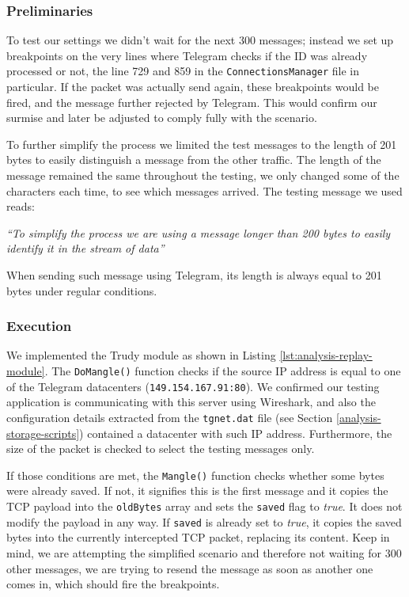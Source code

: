 \documentclass[thesis=M,english]{FITthesis}[2012/10/20]
\begin{document}
\subsubsection{Preliminaries}

To test our settings we didn't wait for the next 300 messages; instead we set up breakpoints on the very lines where Telegram checks if the ID was already processed or not, the line 729 and 859 in the \texttt{ConnectionsManager} file in particular. If the packet was actually send again, these breakpoints would be fired, and the message further rejected by Telegram. This would confirm our surmise and later be adjusted to comply fully with the scenario.

To further simplify the process we limited the test messages to the length of 201 bytes to easily distinguish a message from the other traffic. The length of the message remained the same throughout the testing, we only changed some of the characters each time, to see which messages arrived. The testing message we used reads:

\begin{displayquote}
\emph{``To simplify the process we are using a message longer than 200 bytes to easily identify it in the stream of data''}
\end{displayquote}

When sending such message using Telegram, its length is always equal to 201 bytes under regular conditions.

\subsubsection{Execution}

We implemented the Trudy module as shown in Listing \ref{lst:analysis-replay-module}. The \texttt{DoMangle()} function checks if the source IP address is equal to one of the Telegram datacenters (\texttt{149.154.167.91:80}). We confirmed our testing application is communicating with this server using Wireshark, and also the configuration details extracted from the \texttt{tgnet.dat} file (see Section \ref{analysis-storage-scripts}) contained a datacenter with such IP address. Furthermore, the size of the packet is checked to select the testing messages only.

If those conditions are met, the \texttt{Mangle()} function checks whether some bytes were already saved. If not, it signifies this is the first message and it copies the TCP payload into the \texttt{oldBytes} array and sets the \texttt{saved} flag to \emph{true}. It does not modify the payload in any way. If \texttt{saved} is already set to \emph{true}, it copies the saved bytes into the currently intercepted TCP packet, replacing its content. Keep in mind, we are attempting the simplified scenario and therefore not waiting for 300 other messages, we are trying to resend the message as soon as another one comes in, which should fire the breakpoints.
\end{document}
